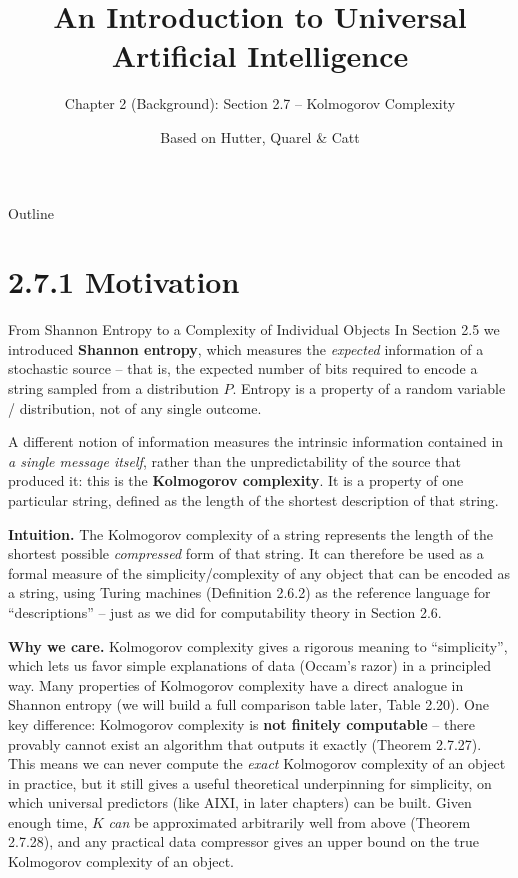 \documentclass[aspectratio=169,10pt]{beamer}
\title[UAI -- Ch.2.7 Kolmogorov Complexity]{An Introduction to Universal Artificial Intelligence}
\subtitle{Chapter 2 (Background): Section 2.7 -- Kolmogorov Complexity}
\author{Based on Hutter, Quarel \& Catt}
\institute{CRC Press, 2024}
\date{}
\begin{document}

\begin{frame}
  \titlepage
\end{frame}

\begin{frame}{Outline}
  \tableofcontents
\end{frame}

\section{2.7.1 Motivation}

\begin{frame}[allowframebreaks]{From Shannon Entropy to a Complexity of Individual Objects}
  In Section 2.5 we introduced \textbf{Shannon entropy}, which measures the
  \emph{expected} information of a stochastic source -- that is, the expected
  number of bits required to encode a string sampled from a distribution
  $P$. Entropy is a property of a random variable / distribution, not of any
  single outcome.

  \medskip
  A different notion of information measures the intrinsic information
  contained in \emph{a single message itself}, rather than the
  unpredictability of the source that produced it: this is the
  \textbf{Kolmogorov complexity}. It is a property of one particular string,
  defined as the length of the shortest description of that string.

  \bigskip
  \textbf{Intuition.} The Kolmogorov complexity of a string represents the
  length of the shortest possible \emph{compressed} form of that string. It
  can therefore be used as a formal measure of the simplicity/complexity of
  any object that can be encoded as a string, using Turing machines
  (Definition 2.6.2) as the reference language for ``descriptions'' -- just
  as we did for computability theory in Section 2.6.

  \framebreak

  \textbf{Why we care.} Kolmogorov complexity gives a rigorous meaning to
  ``simplicity'', which lets us favor simple explanations of data (Occam's
  razor) in a principled way. Many properties of Kolmogorov complexity have
  a direct analogue in Shannon entropy (we will build a full comparison
  table later, Table 2.20). One key difference: Kolmogorov complexity is
  \textbf{not finitely computable} -- there provably cannot exist an
  algorithm that outputs it exactly (Theorem 2.7.27). This means we can
  never compute the \emph{exact} Kolmogorov complexity of an object in
  practice, but it still gives a useful theoretical underpinning for
  simplicity, on which universal predictors (like AIXI, in later chapters)
  can be built. Given enough time, $K$ \emph{can} be approximated
  arbitrarily well from above (Theorem 2.7.28), and any practical data
  compressor gives an upper bound on the true Kolmogorov complexity of an
  object.
\end{frame}
\end{document}
